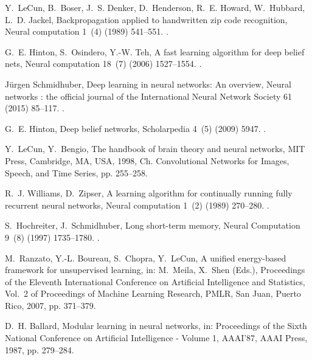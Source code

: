 \documentclass[preprint,5p,compress]{elsarticle}
\begin{document}
\begin{thebibliography}{100}
Y.~LeCun, B.~Boser, J.~S. Denker, D.~Henderson, R.~E. Howard, W.~Hubbard, L.~D.
  Jackel, Backpropagation applied to handwritten zip code recognition, Neural
  computation 1~(4) (1989) 541--551.
\newblock \href {http://dx.doi.org/10.1162/neco.1989.1.4.541}
  {}.

G.~E. Hinton, S.~Osindero, Y.-W. Teh, A fast learning algorithm for deep belief
  nets, Neural computation 18~(7) (2006) 1527--1554.
\newblock \href {http://dx.doi.org/10.1162/neco.2006.18.7.1527}
  {}.

J{\"{u}rgen Schmidhuber}, Deep learning in neural networks: An overview, Neural
  networks : the official journal of the International Neural Network Society
  61 (2015) 85--117.
\newblock \href {http://dx.doi.org/10.1016/j.neunet.2014.09.003}
  {}.

G.~E. Hinton, Deep belief networks, Scholarpedia 4~(5) (2009) 5947.
\newblock \href {http://dx.doi.org/10.4249/scholarpedia.5947}
  {}.

Y.~LeCun, Y.~Bengio, The handbook of brain theory and neural networks, MIT
  Press, Cambridge, MA, USA, 1998, Ch. Convolutional Networks for Images,
  Speech, and Time Series, pp. 255--258.

R.~J. Williams, D.~Zipser, A learning algorithm for continually running fully
  recurrent neural networks, Neural computation 1~(2) (1989) 270--280.
\newblock \href {http://dx.doi.org/10.1162/neco.1989.1.2.270}
  {}.

S.~Hochreiter, J.~Schmidhuber, Long short-term memory, Neural Computation 9~(8)
  (1997) 1735--1780.
\newblock \href {http://dx.doi.org/10.1162/neco.1997.9.8.1735}
  {}.

M.~Ranzato, Y.-L. Boureau, S.~Chopra, Y.~LeCun, A unified energy-based
  framework for unsupervised learning, in: M.~Meila, X.~Shen (Eds.),
  Proceedings of the Eleventh International Conference on Artificial
  Intelligence and Statistics, Vol.~2 of Proceedings of Machine Learning
  Research, PMLR, San Juan, Puerto Rico, 2007, pp. 371--379.

D.~H. Ballard, Modular learning in neural networks, in: Proceedings of the
  Sixth National Conference on Artificial Intelligence - Volume 1, AAAI'87,
  AAAI Press, 1987, pp. 279--284.


\end{thebibliography}
\end{document}
